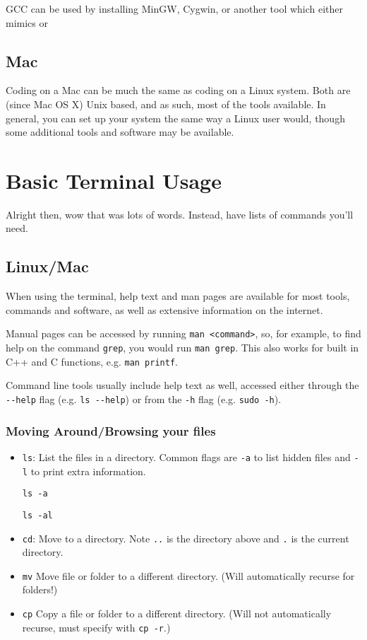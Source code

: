 \documentclass[12pt]{book}
\begin{document}
				GCC can be used by installing MinGW, Cygwin, or another tool which either mimics or 
		\section{Mac}
			Coding on a Mac can be much the same as coding on a Linux system.  Both are (since Mac OS X) Unix based, and as such, most of the tools available.  In general, you can set up your system the same way a Linux user would, though some additional tools and software may be available.  %
			
	\chapter{Basic Terminal Usage}
		Alright then, wow that was lots of words.  Instead, have lists of commands you'll need.
		\section{Linux/Mac}
			When using the terminal, help text and man pages are available for most tools, commands and software, as well as extensive information on the internet.
			
			Manual pages can be accessed by running \verb+man <command>+, so, for example, to find help on the command \verb+grep+, you would run \verb+man grep+.  This also works for built in C++ and C functions, e.g. \verb+man printf+.
			
			Command line tools usually include help text as well, accessed either through the \verb+--help+ flag (e.g. \verb+ls --help+) or from the \verb+-h+ flag (e.g. \verb+sudo -h+).
			\subsection{Moving Around/Browsing your files}
				\begin{itemize}
					\item \verb+ls+: List the files in a directory.  Common flags are \verb+-a+ to list hidden files and \verb+-l+ to print extra information.
					
						\verb+ls -a+
						
						\verb+ls -al+
					\item \verb+cd+: Move to a directory.  Note \verb+..+ is the directory above and \verb+.+ is the current directory.
					\item \verb+mv+ Move file or folder to a different directory. (Will automatically recurse for folders!)
					\item \verb+cp+ Copy a file or folder to a different directory. (Will not automatically recurse, must specify with \verb+cp -r+.)
				\end{itemize}
\end{document}
